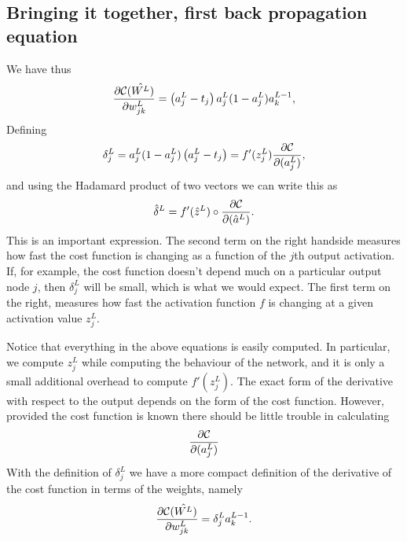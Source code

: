 \documentclass[letterpaper,10pt,english]{sphinxmanual}
\begin{document}
\subsection{Bringing it together, first back propagation equation}
\label{\detokenize{chapter6:bringing-it-together-first-back-propagation-equation}}
We have thus
\begin{equation*}
\begin{split}
\frac{\partial{\cal C}(\hat{W^L})}{\partial w_{jk}^L}  =  \left(a_j^L - t_j\right)a_j^L(1-a_j^L)a_k^{L-1},
\end{split}
\end{equation*}
Defining
\begin{equation*}
\begin{split}
\delta_j^L = a_j^L(1-a_j^L)\left(a_j^L - t_j\right) = f'(z_j^L)\frac{\partial {\cal C}}{\partial (a_j^L)},
\end{split}
\end{equation*}
and using the Hadamard product of two vectors we can write this as
\begin{equation*}
\begin{split}
\hat{\delta}^L = f'(\hat{z}^L)\circ\frac{\partial {\cal C}}{\partial (\hat{a}^L)}.
\end{split}
\end{equation*}
This is an important expression. The second term on the right handside
measures how fast the cost function is changing as a function of the \(j\)th
output activation.  If, for example, the cost function doesn’t depend
much on a particular output node \(j\), then \(\delta_j^L\) will be small,
which is what we would expect. The first term on the right, measures
how fast the activation function \(f\) is changing at a given activation
value \(z_j^L\).

Notice that everything in the above equations is easily computed.  In
particular, we compute \(z_j^L\) while computing the behaviour of the
network, and it is only a small additional overhead to compute
\(f'(z^L_j)\).  The exact form of the derivative with respect to the
output depends on the form of the cost function.
However, provided the cost function is known there should be little
trouble in calculating
\begin{equation*}
\begin{split}
\frac{\partial {\cal C}}{\partial (a_j^L)}
\end{split}
\end{equation*}
With the definition of \(\delta_j^L\) we have a more compact definition of the derivative of the cost function in terms of the weights, namely
\begin{equation*}
\begin{split}
\frac{\partial{\cal C}(\hat{W^L})}{\partial w_{jk}^L}  =  \delta_j^La_k^{L-1}.
\end{split}
\end{equation*}
\end{document}
